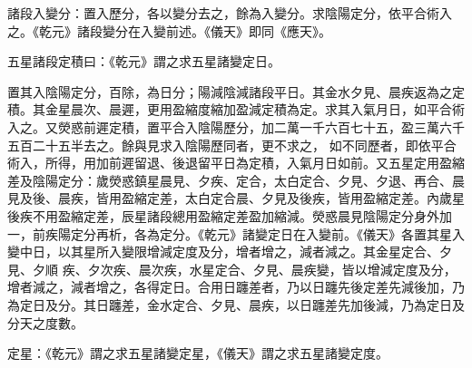 \begin{pinyinscope}
 諸段入變分：置入歷分，各以變分去之，餘為入變分。求陰陽定分，依平合術入之。《乾元》諸段變分在入變前述。《儀天》即同《應天》。



 五星諸段定積曰：《乾元》謂之求五星諸變定日。



 置其入陰陽定分，百除，為日分；陽減陰減諸段平日。其金水夕見、晨疾返為之定積。其金星晨次、晨遲，更用盈縮度縮加盈減定積為定。求其入氣月日，如平合術入之。又熒惑前遲定積，置平合入陰陽歷分，加二萬一千六百七十五，盈三萬六千五百二十五半去之。餘與見求入陰陽歷同者，更不求之，
 如不同歷者，即依平合術入，所得，用加前遲留退、後退留平日為定積，入氣月日如前。又五星定用盈縮差及陰陽定分：歲熒惑鎮星晨見、夕疾、定合，太白定合、夕見、夕退、再合、晨見及後、晨疾，皆用盈縮定差，太白定合晨、夕見及後疾，皆用盈縮定差。內歲星後疾不用盈縮定差，辰星諸段總用盈縮定差盈加縮減。熒惑晨見陰陽定分身外加一，前疾陽定分再析，各為定分。《乾元》諸變定日在入變前。《儀天》各置其星入變中日，以其星所入變限增減定度及分，增者增之，減者減之。其金星定合、夕見、夕順
 疾、夕次疾、晨次疾，水星定合、夕見、晨疾變，皆以增減定度及分，增者減之，減者增之，各得定日。合用日躔差者，乃以日躔先後定差先減後加，乃為定日及分。其日躔差，金水定合、夕見、晨疾，以日躔差先加後減，乃為定日及分天之度數。



 定星：《乾元》謂之求五星諸變定星，《儀天》謂之求五星諸變定度。




\end{pinyinscope}
